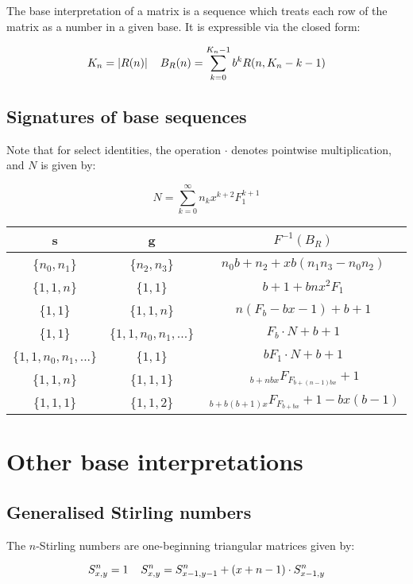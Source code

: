 \documentclass{article}
\begin{document}
\noindent The base interpretation of a matrix is a sequence which treats each row of the matrix as a number in a given base. It is expressible via the closed form:

$$K_n = |R(n)| \hspace{4mm} B_{R}(n) = \sum_{k=0}^{K_n-1} b^k R (n, K_n - k - 1)$$

\subsection{Signatures of base sequences}

\noindent Note that for select identities, the operation $\cdot$ denotes pointwise multiplication, and $N$ is given by:

$$N = \sum_{k=0}^{\infty} n_k x^{k+2} F_1^{k+1}$$

\begin{center}
\begin{tabular}{|c|c|c|}
\hline
s & g & $F^{-1}(B_R)$\\
\hline
\{$n_0, n_1$\} & \{$n_2, n_3$\} & $n_0 b + n_2 + xb(n_1 n_3 - n_0 n_2)$\\
\hline
\{$1,1,n$\} & \{$1,1$\} & $b+1 + bnx^2 F_1$\\
\hline
\{$1,1$\} & \{$1,1,n$\} & $n(F_b - bx - 1) + b + 1$\\
\hline
\{$1, 1$\} & \{$1,1,n_0,n_1,...$\} & $F_b \cdot N + b + 1$\\
\hline
\{$1, 1, n_0, n_1, ...$\} & \{$1,1$\} & $bF_1 \cdot N + b + 1$\\
\hline
\{$1, 1, n$\} & \{$1,1,1$\} & $~_{b + nbx}F_{F_{b + (n-1)bx}}+1$\\
\hline
\{$1, 1, 1$\} & \{$1,1,2$\} & $~_{b + b(b+1)x}F_{F_{b + bx}}+ 1 - bx(b-1)$\\
\hline
\end{tabular}
\end{center}

\section{Other base interpretations}

\subsection{Generalised Stirling numbers}

The $n$-Stirling numbers are one-beginning triangular matrices given by:

$$S_{x,y}^n = 1 \hspace{4mm} S_{x,y}^n = S_{x-1,y-1}^n + (x+n-1) \cdot S_{x-1,y}^n$$
\end{document}
